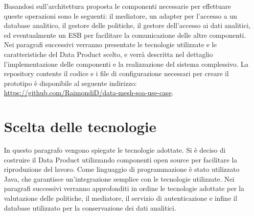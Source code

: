 \documentclass[12pt]{report}
\begin{document}
Basandosi sull'architettura proposta le componenti necessarie per effettuare queste operazioni sono le seguenti: il mediatore, un adapter per l'accesso a un database analitico, il gestore delle politiche, il gestore dell'accesso ai dati analitici, ed eventualmente un ESB per facilitare la comunicazione delle altre componenti.
Nei paragrafi successivi verranno presentate le tecnologie utilizzate e le caratteristiche del Data Product scelto, e  verrà descritta nel dettaglio l'implementazione delle componenti e la realizzazione del sistema complessivo.
La repository contente il codice e i file di configurazione necessari per creare il prototipo è disponibile al seguente indirizzo: \url{https://github.com/RaimondiD/data-mesh-soa-use-case}.

\section{Scelta delle tecnologie}
In questo paragrafo vengono spiegate le tecnologie adottate.
Si è deciso di costruire il Data Product utilizzando componenti open source per facilitare la riproduzione del lavoro.
Come linguaggio di programmazione è stato utilizzato Java, che garantisce un'integrazione semplice con le tecnologie utilizzate.
Nei paragrafi successivi verranno approfonditi in ordine le tecnologie adottate per la valutazione delle politiche, il mediatore, il servizio di autenticazione e infine il database utilizzato per la conservazione dei dati analitici.
\end{document}

